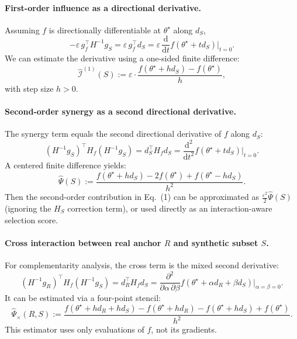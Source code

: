 \documentclass{article}
\theoremstyle{plain}
\theoremstyle{definition}
\theoremstyle{remark}
\begin{document}
\paragraph{First-order influence as a directional derivative.}
Assuming $f$ is directionally differentiable at $\theta^\star$ along $d_S$,
\begin{equation}
-\varepsilon\, g_f^\top H^{-1}g_S
=
\varepsilon\, g_f^\top d_S
=
\varepsilon\,\frac{\mathrm{d}}{\mathrm{d}t} f(\theta^\star + t d_S)\Big|_{t=0}.
\label{eq:first_order_directional}
\end{equation}
We can estimate the derivative using a one-sided finite difference:
\begin{equation}
\widehat{\mathcal{I}}^{(1)}(S)
:=
\varepsilon \cdot \frac{f(\theta^\star + h d_S)-f(\theta^\star)}{h},
\label{eq:first_order_fd}
\end{equation}
with step size $h>0$.

\paragraph{Second-order synergy as a second directional derivative.}
The synergy term equals the second directional derivative of $f$ along $d_S$:
\begin{equation}
(H^{-1}g_S)^\top H_f (H^{-1}g_S)
=
d_S^\top H_f d_S
=
\frac{\mathrm{d}^2}{\mathrm{d}t^2} f(\theta^\star + t d_S)\Big|_{t=0}.
\label{eq:second_order_directional}
\end{equation}
A centered finite difference yields:
\begin{equation}
\widehat{\Psi}(S)
:=
\frac{f(\theta^\star + h d_S) -2f(\theta^\star)+ f(\theta^\star - h d_S)}{h^2}.
\label{eq:second_order_fd}
\end{equation}
Then the second-order contribution in Eq.~(1) can be approximated as
$\frac{\varepsilon^2}{2}\widehat{\Psi}(S)$ (ignoring the $H_S$ correction term),
or used directly as an interaction-aware selection score.

\paragraph{Cross interaction between real anchor $R$ and synthetic subset $S$.}
For complementarity analysis, the cross term is the mixed second derivative:
\begin{equation}
(H^{-1}g_R)^\top H_f (H^{-1}g_S)
=
d_R^\top H_f d_S
=
\frac{\partial^2}{\partial \alpha\,\partial \beta}
f(\theta^\star + \alpha d_R + \beta d_S)\Big|_{\alpha=\beta=0}.
\label{eq:mixed_second_derivative}
\end{equation}
It can be estimated via a four-point stencil:
\begin{equation}
\widehat{\Psi}_\times(R,S)
:=
\frac{
f(\theta^\star + h d_R + h d_S)
- f(\theta^\star + h d_R)
- f(\theta^\star + h d_S)
+ f(\theta^\star)
}{h^2}.
\label{eq:cross_fd}
\end{equation}
This estimator uses only evaluations of $f$, not its gradients.
\end{document}
